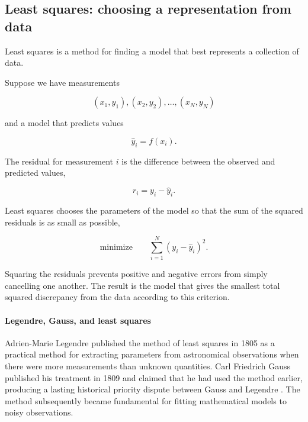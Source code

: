 
\subsection{Least squares: choosing a representation from data}
\label{sec:least-squares}


Least squares is a method for finding a model that best represents a collection of data.

Suppose we have measurements

\[
    (x_1,y_1), (x_2,y_2), \ldots, (x_N,y_N)
\]

and a model that predicts values

\[
    \hat{y}_i=f(x_i).
\]

The residual for measurement $i$ is the difference between the observed and predicted values,

\[
    r_i = y_i-\hat{y}_i.
\]

Least squares chooses the parameters of the model so that the sum of the squared residuals is as small as possible,

\[
    \boxed{\text{minimize} \qquad \sum_{i=1}^{N}\left(y_i-\hat{y}_i\right)^2.}
\]

Squaring the residuals prevents positive and negative errors from simply cancelling one another.
The result is the model that gives the smallest total squared discrepancy from the data according to this criterion.
% 
% 
\paragraph{Legendre, Gauss, and least squares}
Adrien-Marie Legendre published the method of least squares in 1805 as a practical method for extracting parameters from astronomical observations when there were more measurements than unknown quantities.
Carl Friedrich Gauss published his treatment in 1809 and claimed that he had used the method earlier, producing a lasting historical priority dispute between Gauss and Legendre \cite{stigler1981gauss}.
The method subsequently became fundamental for fitting mathematical models to noisy observations.

\bigskip

